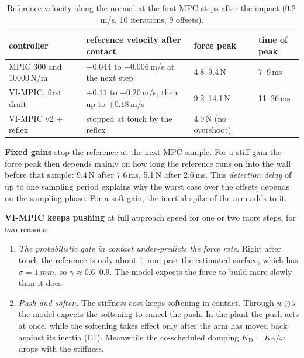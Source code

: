 \documentclass[11pt,a4paper]{article}
\begin{document}
\begin{table}[!htbp]
\centering\small
\caption{Reference velocity along the normal at the first MPC steps after the impact (0.2\,m/s, 10
iterations, 9 offsets).}
\label{tab:diag}
\begin{tabularx}{\linewidth}{@{}>{\raggedright\arraybackslash}p{3.6cm}>{\raggedright\arraybackslash}Xll@{}}
\toprule
controller & reference velocity after contact & force peak & time of peak \\
\midrule
MPIC 300 and 10000\,N/m & $-0.044$ to $+0.006$\,m/s at the next step & 4.8--9.4\,N & 7--9\,ms \\
VI-MPIC, first draft & $+0.11$ to $+0.20$\,m/s, then up to $+0.18$\,m/s & 9.2--14.1\,N & 11--26\,ms \\
VI-MPIC v2 + reflex & stopped at touch by the reflex & 4.9\,N (no overshoot) & -- \\
\bottomrule
\end{tabularx}
\end{table}

\textbf{Fixed gains} stop the reference at the next MPC sample. For a stiff gain the force peak then
depends mainly on how long the reference runs on into the wall before that sample: 9.4\,N after 7.6\,ms,
5.1\,N after 2.6\,ms. This \emph{detection delay} of up to one sampling period explains why the worst
case over the offsets depends on the sampling phase. For a soft gain, the inertial spike of the arm adds
to it.

\textbf{VI-MPIC keeps pushing} at full approach speed for one or two more steps, for two reasons:
\begin{enumerate}[label=(\alph*)]
\item \emph{The probabilistic gate in contact under-predicts the force rate.} Right after touch the
  reference is only about \SI{1}{mm} past the estimated surface, which has $\sigma=\SI{1}{mm}$, so
  $\gamma\approx0.6$--$0.9$. The model expects the force to build more slowly than it does.
\item \emph{Push and soften.} The stiffness cost keeps softening in contact. Through $w\odot\dot s$ the
  model expects the softening to cancel the push. In the plant the push acts at once, while the softening
  takes effect only after the arm has moved back against its inertia (E1). Meanwhile the co-scheduled
  damping $K_\mathrm{D}=K_\mathrm{P}/\omega$ drops with the stiffness.
\end{enumerate}

\end{document}
